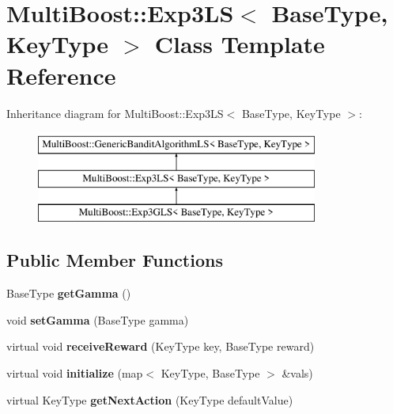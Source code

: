 \hypertarget{classMultiBoost_1_1Exp3LS}{\section{Multi\-Boost\-:\-:Exp3\-L\-S$<$ Base\-Type, Key\-Type $>$ Class Template Reference}
\label{classMultiBoost_1_1Exp3LS}
}
Inheritance diagram for Multi\-Boost\-:\-:Exp3\-L\-S$<$ Base\-Type, Key\-Type $>$\-:\begin{figure}[H]
\begin{center}
\leavevmode
\includegraphics[height=3.000000cm]{classMultiBoost_1_1Exp3LS}
\end{center}
\end{figure}
\subsection*{Public Member Functions}
\begin{DoxyCompactItemize}
\item 
\hypertarget{classMultiBoost_1_1Exp3LS_a167a1e49537b04d314bbe62a71cca1f3}{Base\-Type {\bfseries get\-Gamma} ()}\label{classMultiBoost_1_1Exp3LS_a167a1e49537b04d314bbe62a71cca1f3}

\item 
\hypertarget{classMultiBoost_1_1Exp3LS_a2d6bdb1e914f41fd02fd66a47e2eeed0}{void {\bfseries set\-Gamma} (Base\-Type gamma)}\label{classMultiBoost_1_1Exp3LS_a2d6bdb1e914f41fd02fd66a47e2eeed0}

\item 
\hypertarget{classMultiBoost_1_1Exp3LS_af9b4f88144a99fd7d66905861d7d3d43}{virtual void {\bfseries receive\-Reward} (Key\-Type key, Base\-Type reward)}\label{classMultiBoost_1_1Exp3LS_af9b4f88144a99fd7d66905861d7d3d43}

\item 
\hypertarget{classMultiBoost_1_1Exp3LS_a7d9f285d5479e21f9ea1adab87a43f7d}{virtual void {\bfseries initialize} (map$<$ Key\-Type, Base\-Type $>$ \&vals)}\label{classMultiBoost_1_1Exp3LS_a7d9f285d5479e21f9ea1adab87a43f7d}

\item 
\hypertarget{classMultiBoost_1_1Exp3LS_a2cf13b6ca2e2ff3c419b4fead2cfa5df}{virtual Key\-Type {\bfseries get\-Next\-Action} (Key\-Type default\-Value)}\label{classMultiBoost_1_1Exp3LS_a2cf13b6ca2e2ff3c419b4fead2cfa5df}

\end{DoxyCompactItemize}
